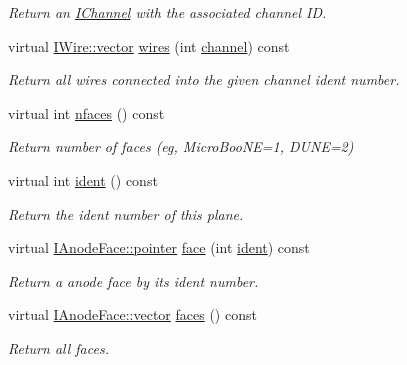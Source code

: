 \begin{DoxyCompactItemize}
\begin{DoxyCompactList}\small\item\em Return an \hyperlink{class_wire_cell_1_1_i_channel}{I\+Channel} with the associated channel ID. \end{DoxyCompactList}\item 
virtual \hyperlink{class_wire_cell_1_1_i_data_ae1a9f863380499bb43f39fabb6276660}{I\+Wire\+::vector} \hyperlink{class_wire_cell_1_1_gen_1_1_mega_anode_plane_a1d4b6dd24d9b2d805120eed53e153bc3}{wires} (int \hyperlink{class_wire_cell_1_1_gen_1_1_mega_anode_plane_a3cc2a292c89472524f21379c0eff1111}{channel}) const
\begin{DoxyCompactList}\small\item\em Return all wires connected into the given channel ident number. \end{DoxyCompactList}\item 
virtual int \hyperlink{class_wire_cell_1_1_gen_1_1_mega_anode_plane_a4ccf1f789e1f62b35993d95b659b92c3}{nfaces} () const
\begin{DoxyCompactList}\small\item\em Return number of faces (eg, Micro\+Boo\+NE=1, D\+U\+NE=2) \end{DoxyCompactList}\item 
virtual int \hyperlink{class_wire_cell_1_1_gen_1_1_mega_anode_plane_a4f464401cebc46073d4fef4cafe67d97}{ident} () const
\begin{DoxyCompactList}\small\item\em Return the ident number of this plane. \end{DoxyCompactList}\item 
virtual \hyperlink{class_wire_cell_1_1_interface_a09c548fb8266cfa39afb2e74a4615c37}{I\+Anode\+Face\+::pointer} \hyperlink{class_wire_cell_1_1_gen_1_1_mega_anode_plane_ad9c13939093664e740ade87c8d89ba94}{face} (int \hyperlink{class_wire_cell_1_1_gen_1_1_mega_anode_plane_a4f464401cebc46073d4fef4cafe67d97}{ident}) const
\begin{DoxyCompactList}\small\item\em Return a anode face by its ident number. \end{DoxyCompactList}\item 
virtual \hyperlink{class_wire_cell_1_1_i_component_a18978d88ce697af5941655a89660fd4e}{I\+Anode\+Face\+::vector} \hyperlink{class_wire_cell_1_1_gen_1_1_mega_anode_plane_a8f1eacc7a7ec70f52befcaa2c9321591}{faces} () const
\begin{DoxyCompactList}\small\item\em Return all faces. \end{DoxyCompactList}\end{DoxyCompactItemize}

